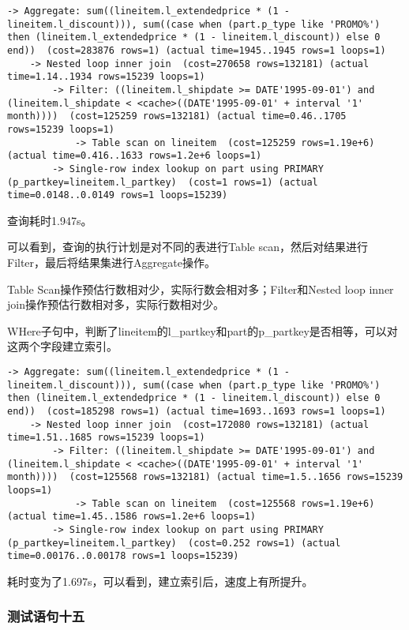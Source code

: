\documentclass{article}
\begin{document}
\begin{lstlisting}
-> Aggregate: sum((lineitem.l_extendedprice * (1 - lineitem.l_discount))), sum((case when (part.p_type like 'PROMO%') then (lineitem.l_extendedprice * (1 - lineitem.l_discount)) else 0 end))  (cost=283876 rows=1) (actual time=1945..1945 rows=1 loops=1)
    -> Nested loop inner join  (cost=270658 rows=132181) (actual time=1.14..1934 rows=15239 loops=1)
        -> Filter: ((lineitem.l_shipdate >= DATE'1995-09-01') and (lineitem.l_shipdate < <cache>((DATE'1995-09-01' + interval '1' month))))  (cost=125259 rows=132181) (actual time=0.46..1705 rows=15239 loops=1)
            -> Table scan on lineitem  (cost=125259 rows=1.19e+6) (actual time=0.416..1633 rows=1.2e+6 loops=1)
        -> Single-row index lookup on part using PRIMARY (p_partkey=lineitem.l_partkey)  (cost=1 rows=1) (actual time=0.0148..0.0149 rows=1 loops=15239)
\end{lstlisting}

查询耗时1.947s。

可以看到，查询的执行计划是对不同的表进行Table scan，然后对结果进行Filter，最后将结果集进行Aggregate操作。

Table Scan操作预估行数相对少，实际行数会相对多；Filter和Nested loop inner join操作预估行数相对多，实际行数相对少。

WHere子句中，判断了lineitem的l\_partkey和part的p\_partkey是否相等，可以对这两个字段建立索引。

\begin{lstlisting}
-> Aggregate: sum((lineitem.l_extendedprice * (1 - lineitem.l_discount))), sum((case when (part.p_type like 'PROMO%') then (lineitem.l_extendedprice * (1 - lineitem.l_discount)) else 0 end))  (cost=185298 rows=1) (actual time=1693..1693 rows=1 loops=1)
    -> Nested loop inner join  (cost=172080 rows=132181) (actual time=1.51..1685 rows=15239 loops=1)
        -> Filter: ((lineitem.l_shipdate >= DATE'1995-09-01') and (lineitem.l_shipdate < <cache>((DATE'1995-09-01' + interval '1' month))))  (cost=125568 rows=132181) (actual time=1.5..1656 rows=15239 loops=1)
            -> Table scan on lineitem  (cost=125568 rows=1.19e+6) (actual time=1.45..1586 rows=1.2e+6 loops=1)
        -> Single-row index lookup on part using PRIMARY (p_partkey=lineitem.l_partkey)  (cost=0.252 rows=1) (actual time=0.00176..0.00178 rows=1 loops=15239)
\end{lstlisting}

耗时变为了1.697s，可以看到，建立索引后，速度上有所提升。

\subsubsection{测试语句十五}
\end{document}
